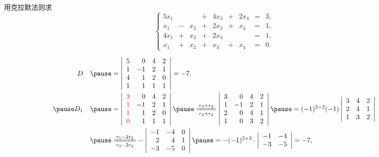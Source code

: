 \begin{frame}
  \begin{footnotesize}
    \begin{exampleblock}{31}
      用克拉默法则求
      $$
      \left\{
      \begin{array}{rcrcrcrcrc}
        5x_1&&&+&4x_3&+&2x_4&=&3,\\[0.1cm]
        x_1&-&x_2&+&2x_3&+& x_4&=&1,\\[0.1cm]
        4x_1&+&x_2&+&2x_3& & &=&1,\\[0.1cm]
         x_1&+&x_2&+& x_3&+&x_4&=&0.
      \end{array}
      \right.
      $$
    \end{exampleblock}
    \pause
    \jiename
    $$
    \begin{array}{rl}
      D &\pause = \left|
      \begin{array}{rrrr}
        5&0&4&2\\
        1&-1&2&1\\
        4&1&2&0\\
        1&1&1&1
      \end{array}
      \right| = -7, \\[0.3in] \pause 
      D_1 &\pause = \left|
      \begin{array}{rrrr}
        \red{3}&0&4&2\\
        \red{1}&-1&2&1\\
        \red{1}&1&2&0\\
        \red{0}&1&1&1
      \end{array}
      \right| \pause\xlongequal[r_4+r_2]{r_3+r_2} \left|
      \begin{array}{rrrr}
        3&0&4&2\\
        1&-1&2&1\\
        2&0&4&1\\
        1&0&3&2
      \end{array}
      \right| \pause=  (-1)^{2+2} (-1) \left|
      \begin{array}{rrrr}
        3&4&2\\
        2&4&1\\
        1&3&2
      \end{array}
      \right| \\[0.3in]
      &\pause \xlongequal[r_3-2r_2]{r_1-2r_2}  - \left|
      \begin{array}{rrrr}
        -1&-4&0\\
        2&4&1\\
        -3&-5&0
      \end{array}
      \right| \pause = - (-1)^{2+3} \cdot  \left|
      \begin{array}{rrrr}
        -1&-4\\
        -3&-5
      \end{array}
      \right| = -7,
    \end{array}
    $$
  \end{footnotesize}
\end{frame}

